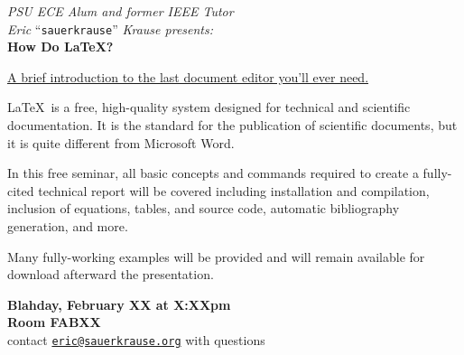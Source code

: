 \documentclass{article}
\begin{document}
    \begin{center} \LARGE
        \vspace*{.5in}
        \textit{PSU ECE Alum and former IEEE Tutor}\\
        \textit{Eric} ``\texttt{sauerkrause}'' \textit{Krause presents:}\\ \vspace{.45in}
        {\Huge \bf How Do \LaTeX?}\\\vspace{.35in}
    
        \LARGE\underline{A brief introduction to the last document editor you'll ever need.}\vspace{.2in}
    \end{center}

    \Large\LaTeX\ is a  free, high-quality system designed for technical and scientific documentation. It is the standard for the publication of scientific documents, but it is quite different from Microsoft Word.\vspace{.2in}

    In this free seminar, all basic concepts and commands required to create a fully-cited technical report will be covered including installation and compilation, inclusion of equations, tables, and source code, automatic bibliography generation, and more.\vspace{.2in}

    Many fully-working examples will be provided and will remain available for download afterward the presentation. 
  
    \begin{center} \Huge
        \textbf{Blahday, February XX at X:XXpm\\Room FABXX\\}\vspace{.2in}
        \Large contact \texttt{\href{mailto:eric@sauerkrause.org}{eric@sauerkrause.org}} with questions
    \end{center}
\end{document}
